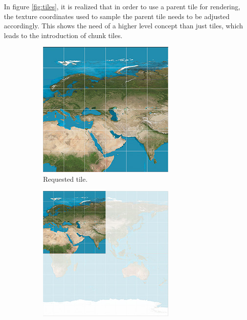 In figure \ref{fig:tiles}, it is realized that in order to use a parent tile for rendering, the texture coordinates used to sample the parent tile needs to be adjusted accordingly. This shows the need of a higher level concept than just tiles, which leads to the introduction of chunk tiles.

\begin{figure}[htbp]
    \centering
    \begin{subfigure}[t]{0.3\textwidth}
        \includegraphics[width=\textwidth]{figures/implementation/chunktile/chunktile1.jpg}
        \caption{Requested tile.}
    \end{subfigure}
    \quad
    \begin{subfigure}[t]{0.3\textwidth}
        \includegraphics[width=\textwidth]{figures/implementation/chunktile/chunktile2.jpg}

\end{subfigure}
\end{figure}
